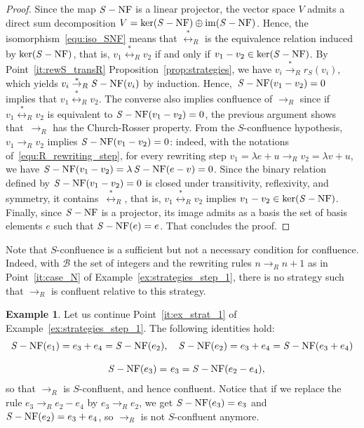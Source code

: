 \documentclass[11pt]{article}
\theoremstyle{definition}
\newtheorem{example}[theorem]{Example}
\newcommand\basis{\mathscr{B}}
\DeclareMathOperator{\im}{im}
\newcommand\rewR{\to_R}
\newcommand\transR{\overset{*}{\to}_R}
\newcommand\equivR{\overset{*}{\leftrightarrow}_R}
\DeclareMathOperator{\SNF}{{\it S}-NF}
\begin{document}
\begin{proof}
  Since the map $\SNF$ is a linear projector, the vector space $V$
  admits a direct sum decomposition $V=\ker(\SNF)\oplus\im(\SNF)$. Hence,
  the isomorphism~\eqref{equ:iso_SNF} means that $\equivR$ is the
  equivalence relation induced by $\ker(\SNF)$, that is, $v_1\equivR v_2$
  if and only if $v_1-v_2\in\ker(\SNF)$. By
  Point~\ref{it:rewS_transR} Proposition~\ref{prop:strategies},
  we have $v_i\transR r_S(v_i)$, which yields $v_i\transR\SNF(v_i)$ by
  induction. Hence,~$\SNF(v_1-v_2)=0$ implies that $v_1\equivR v_2$. The
  converse also implies confluence of $\rewR$ since if $v_1\equivR v_2$
  is equivalent to $\SNF(v_1-v_2)=0$, the previous argument shows
  that~$\rewR$ has the Church-Rosser property. From the
  $S$-confluence hypothesis, $v_1\rewR v_2$ implies $\SNF(v_1-v_2)=0$:
  indeed, with the notations of~\eqref{equ:R_rewriting_step}, for every
  rewriting step $v_1=\lambda e+u\rewR v_2=\lambda v+u$, we have
  $\SNF(v_1-v_2)=\lambda\SNF(e-v)=0$. Since the binary relation defined
  by $\SNF(v_1-v_2)=0$ is closed under transitivity, reflexivity, and
  symmetry, it contains~$\equivR$, that is, $v_1\equivR v_2$ implies
  $v_1-v_2\in\ker(\SNF)$. Finally, since $\SNF$ is a projector, its image
  admits as a basis the set of basis elements $e$ such that $\SNF(e)=e$.
  That concludes the proof.
\end{proof}
\smallskip

Note that $S$-confluence is a sufficient but not a necessary condition for
confluence. Indeed, with $\basis$ the set of integers and the rewriting rules
$n\rewR n+1$ as in Point~\ref{it:case_N} of
Example~\ref{ex:strategies_step_1}, there is no strategy such that
$\rewR$ is confluent relative to this strategy. 
\smallskip

\begin{example}\label{ex:S-conf}
  Let us continue Point~\ref{it:ex_strat_1} of
  Example~\ref{ex:strategies_step_1}. The following identities hold:
  \[\begin{split}
  \SNF(e_1)=e_3+e_4=\SNF(e_2),&\quad\SNF(e_2)=e_3+e_4=\SNF(e_3+e_4)
  \\[0.3cm]
  \SNF(e_3)=& \ e_3=\SNF(e_2-e_4),
  \end{split}
  \smallskip\]
  so that $\rewR$ is $S$-confluent, and hence confluent. Notice that if
  we replace the rule $e_3\rewR e_2-e_4$ by $e_3\rewR e_2$, we get
  $\SNF(e_3)=e_3$ and $\SNF(e_2)=e_3+e_4$, so $\rewR$ is not
  $S$-confluent anymore. 
\end{example}
\smallskip
\end{document}
